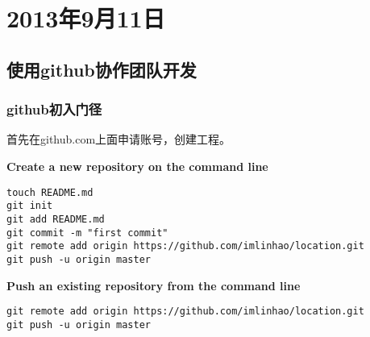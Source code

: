 \chapter{2013年9月11日}
\section{使用github协作团队开发}
\subsection{github初入门径}
首先在github.com上面申请账号，创建工程。

\textbf{Create a new repository on the command line}
\begin{lstlisting}
touch README.md
git init
git add README.md
git commit -m "first commit"
git remote add origin https://github.com/imlinhao/location.git
git push -u origin master
\end{lstlisting}

\textbf{Push an existing repository from the command line}
\begin{lstlisting}
git remote add origin https://github.com/imlinhao/location.git
git push -u origin master
\end{lstlisting}

